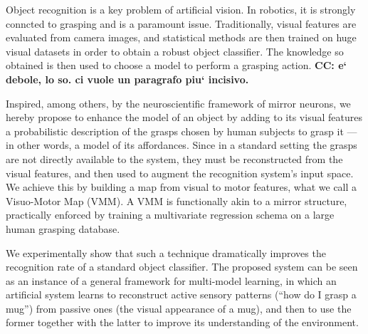 Object recognition is a key problem of artificial vision. In robotics,
it is strongly conncted to grasping and is a paramount issue. Traditionally,
visual features are evaluated from camera images, and statistical methods
are then trained on huge visual datasets in order to obtain a robust object
classifier. The knowledge so obtained is then used to choose a model to
perform a grasping action. \textbf{CC: e` debole, lo so. ci vuole un paragrafo
piu` incisivo.}

Inspired, among others, by the neuroscientific framework of mirror neurons,
we hereby propose to enhance the model of an object by adding to its visual
features a probabilistic description of the grasps chosen by human subjects
to grasp it --- in other words, a model of its affordances.
Since in a standard setting the grasps are not directly
available to the system, they must be reconstructed from the visual features,
and then used to augment the recognition system's input space. We achieve
this by building a map from visual to motor features, what
we call a Visuo-Motor Map (VMM). A VMM is functionally akin to a mirror
structure, practically enforced by training a multivariate regression schema
on a large human grasping database.

We experimentally show that such a technique dramatically improves the
recognition rate of a standard object classifier.
The proposed system can be seen as an instance of a general framework for
multi-model learning, in which an artificial system learns to reconstruct
active sensory patterns (``how do I grasp a mug'') from passive ones (the
visual appearance of a mug), and then to use the former together with the
latter to improve its understanding of the environment.
